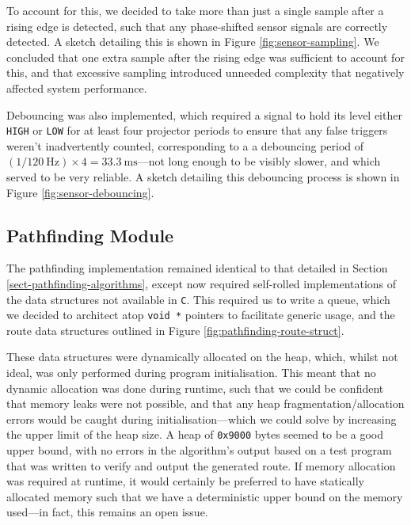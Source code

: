 \documentclass[conference]{IEEEtran}
\begin{document}
To account for this, we decided to take more than just a single sample after a rising edge is detected, such that any phase-shifted sensor signals are correctly detected.
A sketch detailing this is shown in Figure \ref{fig:sensor-sampling}.
We concluded that one extra sample after the rising edge was sufficient to account for this, and that excessive sampling introduced unneeded complexity that negatively affected system performance.

Debouncing was also implemented, which required a signal to hold its level either \texttt{HIGH} or \texttt{LOW} for at least four projector periods to ensure that any false triggers weren't inadvertently counted, corresponding to a a debouncing period of $\left(1 / \qty{120}{\hertz}\right) \times 4 = \qty{33.3}{\ms}$—not long enough to be visibly slower, and which served to be very reliable.
A sketch detailing this debouncing process is shown in Figure \ref{fig:sensor-debouncing}.

\subsection{Pathfinding Module}

The pathfinding implementation remained identical to that detailed in Section \ref{sect-pathfinding-algorithms}, except now required self-rolled implementations of the data structures not available in \texttt{C}.
This required us to write a queue, which we decided to architect atop \texttt{void *} pointers to facilitate generic usage, and the route data structures outlined in Figure \ref{fig:pathfinding-route-struct}.

These data structures were dynamically allocated on the heap, which, whilst not ideal, was only performed during program initialisation.
This meant that no dynamic allocation was done during runtime, such that we could be confident that memory leaks were not possible, and that any heap fragmentation/allocation errors would be caught during initialisation—which we could solve by increasing the upper limit of the heap size.
A heap of \texttt{0x9000} bytes seemed to be a good upper bound, with no errors in the algorithm's output based on a test program that was written to verify and output the generated route.
If memory allocation was required at runtime, it would certainly be preferred to have statically allocated memory such that we have a deterministic upper bound on the memory used—in fact, this remains an open issue.
\end{document}
